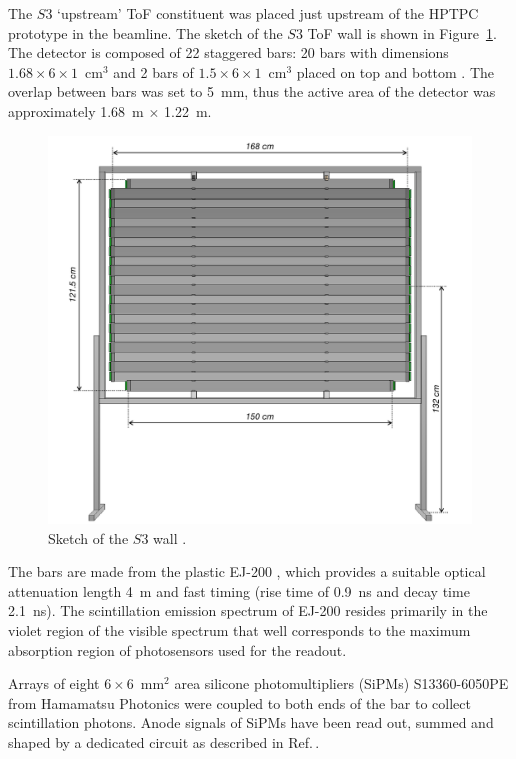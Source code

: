 The $S3$ `upstream' ToF constituent was placed just upstream of the HPTPC prototype in the beamline. The sketch of the $S3$ ToF wall is shown in Figure~\ref{fig:S3sketch}. The detector is composed of 22 staggered bars:  20 bars with dimensions $1.68 \times 6 \times 1$~cm$^3$ and 2 bars of  $1.5 \times 6 \times 1$~cm$^3$ placed on top and bottom \cite{S3-proceedings}.
The overlap between bars was set to 5~mm, thus the active area of the detector was approximately 1.68~m $\times$ 1.22~m.
     \begin{figure}
      \centering
    \includegraphics[width=0.7\linewidth]{files/Figures/uToF_sketch.pdf}
    	\caption{Sketch of the $S3$ wall \cite{S3-proceedings}.}
    		\label{fig:S3sketch}
    \end{figure}
    
The bars are made from the plastic EJ-200 \cite{SCIONIX}, which 
provides a suitable optical attenuation length 4~m and fast timing (rise time of 0.9~ns and decay time 2.1~ns). 
The scintillation emission spectrum of EJ-200 resides primarily in the violet region of the visible spectrum that well corresponds to the maximum absorption region of photosensors used for the readout.

Arrays of eight $6 \times 6$~mm$^2$ area silicone photomultipliers (SiPMs) S13360-6050PE from Hamamatsu Photonics \cite{Hamamatsu} were coupled to both ends of the bar to collect scintillation photons. Anode signals of SiPMs have been read out, summed and shaped by a dedicated circuit as described in Ref.\,\cite{S3-readout}.

